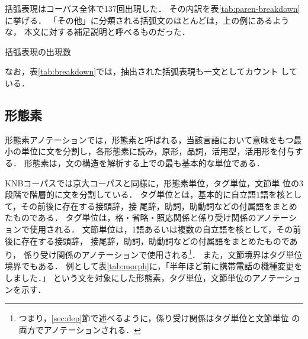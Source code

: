 \documentclass[japanese]{jnlp_JS2.0}
\begin{document}


括弧表現はコーパス全体で137回出現した．
その内訳を表\ref{tab:paren-breakdown}に挙げる．
「その他」に分類される括弧文のほとんどは，上の例にあるような，
本文に対する補足説明と呼べるものだった．

\begin{table}[b]
\caption{括弧表現の出現数}
\label{tab:paren-breakdown}

\end{table}

なお，表\ref{tab:breakdown}では，抽出された括弧表現も一文としてカウント
している．



\subsection{形態素}


形態素アノテーションでは，形態素と呼ばれる，当該言語において意味をもつ最
小の単位に文を分割し，各形態素に読み，原形，品詞，活用型，活用形を付与す
る．
形態素は，文の構造を解析する上での最も基本的な単位である．

KNBコーパスでは京大コーパスと同様に，形態素単位，タグ単位，文節単
位の3段階で階層的に文を分割している．
タグ単位とは，基本的に自立語1語を核として，その前後に存在する接頭辞，接
尾辞，助詞，助動詞などの付属語をまとめたものである．
タグ単位は，格・省略・照応関係と係り受け関係のアノテーションで使用される．
文節単位は，1語あるいは複数の自立語を核として，その前後に存在する接頭辞，
接尾辞，助詞，助動詞などの付属語をまとめたものであり，
係り受け関係のアノテーションで使用される\footnote{
つまり，\ref{sec:dep}節で述べるように，係り受け関係はタグ単位と文節単位
の両方でアノテーションされる．
}．
また，文節境界はタグ単位境界でもある．
例として表\ref{tab:morph}に，「半年ほど前に携帯電話の機種変更をしました．」
という文を対象にした形態素，タグ単位，文節単位のアノテーションを示す．
\end{document}
